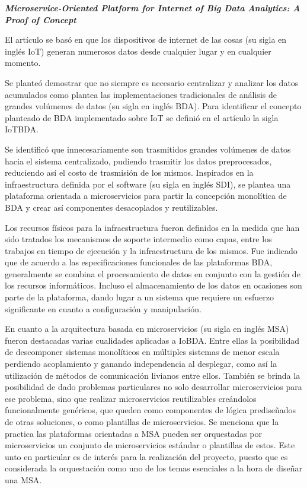 
\textbf{
    \emph{ Microservice-Oriented Platform for Internet of Big Data Analytics: A Proof of Concept }
} \cite{li_microservice-oriented_2019}

El artículo se basó en que los dispositivos de internet de las cosas (su sigla en inglés IoT) generan numerosos datos desde cualquier lugar y en cualquier momento.

Se planteó demostrar que no siempre es necesario centralizar y analizar los datos acumulados como plantea las implementaciones tradicionales de análisis de grandes volúmenes de datos (su sigla en inglés BDA). Para identificar el concepto planteado de BDA implementado sobre IoT se definió en el artículo la sigla IoTBDA.

Se identificó que innecesariamente son trasmitidos grandes volúmenes de datos hacia el sistema centralizado, pudiendo trasmitir los datos preprocesados, reduciendo así el costo de trasmisión de los mismos. 
Inspirados en la infraestructura definida por el software (su sigla en inglés SDI), se plantea una plataforma orientada a microservicios para partir la concepción monolítica de BDA y crear así componentes desacoplados y reutilizables.

Los recursos físicos para la infraestructura fueron definidos en la medida que han sido tratados los mecanismos de soporte intermedio como capas, entre los trabajos en tiempo de ejecución y la infraestructura de los mismos.
Fue indicado que  de acuerdo a las especificaciones funcionales de las plataformas BDA, generalmente se combina el procesamiento de datos en conjunto con la gestión de los recursos informáticos. Incluso el almacenamiento de los datos en ocasiones son parte de la plataforma, dando lugar a un sistema que requiere un esfuerzo significante en cuanto a configuración y manipulación.

En cuanto a la arquitectura basada en microservicios (su sigla en inglés MSA) fueron destacadas varias cualidades aplicadas a IoBDA. Entre ellas la posibilidad de descomponer sistemas monolíticos en múltiples sistemas de menor escala perdiendo acoplamiento y ganando independencia al desplegar, como así la utilización de métodos de comunicación livianos entre ellos. También se brinda la posibilidad de dado problemas particulares no solo desarrollar microservicios para ese problema, sino que realizar microservicios reutilizables creándolos funcionalmente genéricos, que queden como componentes de lógica prediseñados de otras soluciones, o como plantillas de microservicios. Se menciona que la practica las plataformas orientadas a MSA pueden ser orquestadas por microservicios un conjunto de microservicios estándar o plantillas de estos. Este unto en particular es de interés para la realización del proyecto, puesto que es considerada la orquestación como uno de los temas esenciales  a  la hora de diseñar una MSA. 

